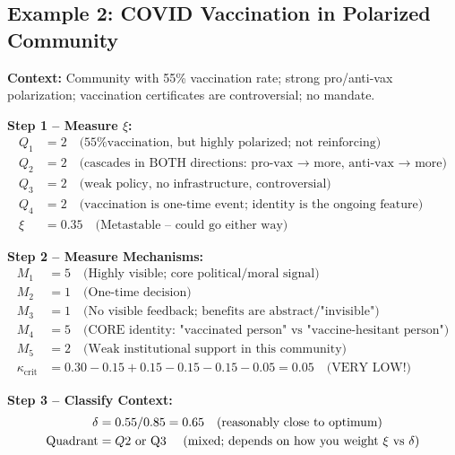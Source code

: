 \documentclass[11pt, a4paper]{article}
\begin{document}
\subsection{Example 2: COVID Vaccination in Polarized Community}

\textbf{Context:} Community with 55\% vaccination rate; strong pro/anti-vax polarization;
vaccination certificates are controversial; no mandate.

\textbf{Step 1 – Measure $\xi$:}
\begin{align}
Q_1 &= 2 \quad \text{(55\% vaccination, but highly polarized; not reinforcing)} \\
Q_2 &= 2 \quad \text{(cascades in BOTH directions: pro-vax → more, anti-vax → more)} \\
Q_3 &= 2 \quad \text{(weak policy, no infrastructure, controversial)} \\
Q_4 &= 2 \quad \text{(vaccination is one-time event; identity is the ongoing feature)} \\
\xi &= 0.35 \quad \text{(Metastable – could go either way)}
\end{align}

\textbf{Step 2 – Measure Mechanisms:}
\begin{align}
M_1 &= 5 \quad \text{(Highly visible; core political/moral signal)} \\
M_2 &= 1 \quad \text{(One-time decision)} \\
M_3 &= 1 \quad \text{(No visible feedback; benefits are abstract/"invisible")} \\
M_4 &= 5 \quad \text{(CORE identity: "vaccinated person" vs "vaccine-hesitant person")} \\
M_5 &= 2 \quad \text{(Weak institutional support in this community)} \\
\kappa_{\text{crit}} &= 0.30 - 0.15 + 0.15 - 0.15 - 0.15 - 0.05 = 0.05 \quad \text{(VERY LOW!)}
\end{align}

\textbf{Step 3 – Classify Context:}
\begin{align}
\delta &= 0.55 / 0.85 = 0.65 \quad \text{(reasonably close to optimum)} \\
\text{Quadrant} &= Q2 \text{ or Q3 \quad (mixed; depends on how you weight $\xi$ vs $\delta$)}
\end{align}
\end{document}
